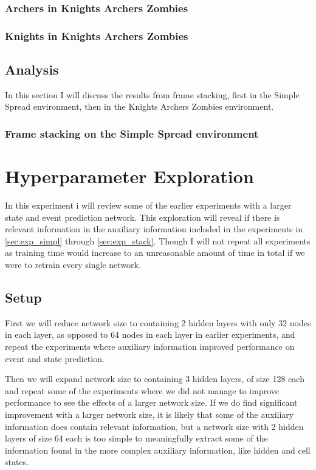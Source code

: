\documentclass[UKenglish]{uiomasterthesis}
\begin{document}
\subsubsection{Archers in Knights Archers Zombies}
\label{sec:kaz_exp3}

\subsubsection{Knights in Knights Archers Zombies}

\subsection{Analysis}
In this section I will discuss the results from frame stacking, first in the Simple Spread environment, then in the Knights Archers Zombies environment.
\subsubsection{Frame stacking on the Simple Spread environment}




\section{Hyperparameter Exploration}
\label{sec:exp_param}
In this experiment i will review some of the earlier experiments with a larger state and event prediction network. This exploration will reveal if there is relevant information in the auxiliary information included in the experiments in \cref{sec:exp_simpl} through \cref{sec:exp_stack}. Though I will not repeat all experiments as training time would increase to an unreasonable amount of time in total if we were to retrain every single network.

\subsection{Setup}
First we will reduce network size to containing 2 hidden layers with only 32 nodes in each layer, as opposed to 64 nodes in each layer in earlier experiments, and repeat the experiments where auxiliary information improved performance on event and state prediction.

Then we will expand network size to containing 3 hidden layers, of size 128 each and repeat some of the experiments where we did not manage to improve performance to see the effects of a larger network size. If we do find significant improvement with a larger network size, it is likely that some of the auxiliary information does contain relevant information, but a network size with 2 hidden layers of size 64 each is too simple to meaningfully extract some of the information found in the more complex auxiliary information, like hidden and cell states.
\end{document}
